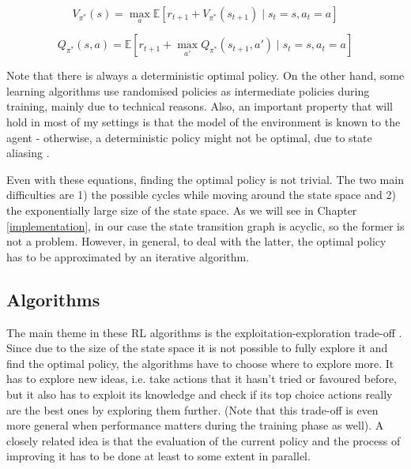 \begin{equation}\label{eq:bellmanState}
V_{\pi^*}(s) = \max_a \mathbb{E} [r_{t+1} + V_{\pi^*}(s_{t+1}) \mid s_t=s, a_t=a]
\end{equation}


\begin{equation} \label{eq:bellmanAction}
Q_{\pi^*}(s,a) = \mathbb{E} [r_{t+1} + \max_{a'} Q_{\pi^*}(s_{t+1},a') \mid s_t=s, a_t=a ] 
\end{equation}


Note that there is always a deterministic optimal policy. On the other hand, some learning algorithms use randomised policies as intermediate policies during training, mainly due to technical reasons. Also, an important property that will hold in most of my settings is that the model of the environment is known to the agent - otherwise, a deterministic policy might not be optimal, due to state aliasing .


Even with these equations, finding the optimal policy is not trivial. The two main difficulties are 1) the possible cycles while moving around the state space and 2) the exponentially large size of the state space. As we will see in Chapter \ref{implementation}, in our case the state transition graph is acyclic, so the former is not a problem. However, in general, to deal with the latter, the optimal policy has to be approximated by an iterative algorithm.



\subsection{Algorithms}


The main theme in these RL algorithms is the exploitation-exploration trade-off \cite{kaelbling1996explorationexploitation}. Since due to the size of the state space it is not possible to fully explore it and find the optimal policy, the algorithms have to choose where to explore more. It has to explore new ideas, i.e. take actions that it hasn't tried or favoured before, but it also has to exploit its knowledge and check if its top choice actions really are the best ones by exploring them further. (Note that this trade-off is even more general when performance matters during the training phase as well). A closely related idea is that the evaluation of the current policy and the process of improving it has to be done at least to some extent in parallel.


